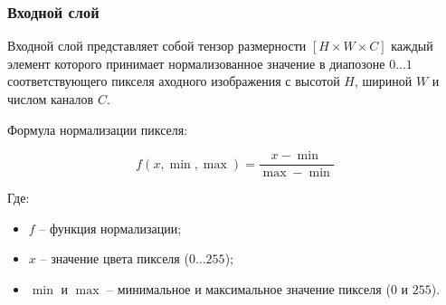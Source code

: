 \subsubsection{Входной слой}

Входной слой представляет собой тензор размерности $\left[H\times W\times C\right]$ каждый элемент которого принимает нормализованное значение в диапозоне $0...1$ соответствующего пикселя аходного изображения с высотой $H$, шириной $W$ и числом каналов $C$. 

Формула нормализации пикселя:

$$
f(x, \min, \max) = \frac{x-\min}{\max - \min}
$$

Где:
\begin{itemize}
    \item $f$ -- функция нормализации;
    \item $x$ -- значение цвета пикселя ($0...255$);
    \item $\min$ и $\max$ -- минимальное и максимальное значение пикселя ($0$ и $255$).
\end{itemize}